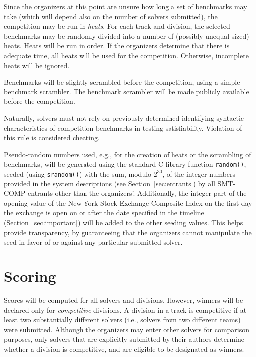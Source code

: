 \documentclass[12pt]{article}
\begin{document}
%
Since the organizers at this point are unsure how long a set of
benchmarks may take (which will depend also on the number of solvers
submitted), the competition may be run in \emph{heats}.  For each
track and division, the selected benchmarks may be randomly divided
into a number of (possibly unequal-sized) heats.  Heats will be run in
order.  If the organizers determine that there is adequate time, all
heats will be used for the competition.  Otherwise, incomplete heats
will be ignored.

%
Benchmarks will be slightly scrambled before the competition, using a
simple benchmark scrambler.  The benchmark scrambler will be made
publicly available before the competition.

Naturally, solvers must not rely on previously determined identifying
syntactic characteristics of competition benchmarks in testing
satisfiability.  Violation of this rule is considered cheating.

%
Pseudo-random numbers used, e.g., for the creation of heats or the
scrambling of benchmarks, will be generated using the standard C
library function \texttt{random()}, seeded (using \texttt{srandom()})
with the sum, modulo $2^{30}$, of the integer numbers provided in the
system descriptions (see Section~\ref{sec:entrants}) by all SMT-COMP
entrants other than the organizers'.  Additionally, the integer part
of the opening value of the New York Stock Exchange Composite Index on
the first day the exchange is open on or after the date specified in
the timeline (Section~\ref{sec:important}) will be added to the other
seeding values.  This helps provide transparency, by guaranteeing that
the organizers cannot manipulate the seed in favor of or against any
particular submitted solver.


\section{Scoring}

Scores will be computed for all solvers and divisions.  However,
winners will be declared only for \emph{competitive} divisions.  A
division in a track is competitive if at least two substantially
different solvers (i.e., solvers from two different teams) were
submitted.  Although the organizers may enter other solvers for
comparison purposes, only solvers that are explicitly submitted by
their authors determine whether a division is competitive, and are
eligible to be designated as winners.
\end{document}
